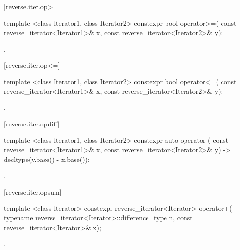 [reverse.iter.op>=]{}

%
\begin{itemdecl}
template <class Iterator1, class Iterator2>
  constexpr bool operator>=(
    const reverse_iterator<Iterator1>& x,
    const reverse_iterator<Iterator2>& y);
\end{itemdecl}

\begin{itemdescr}
\pnum
\returns
{}.
\end{itemdescr}

[reverse.iter.op<=]{}

%
\begin{itemdecl}
template <class Iterator1, class Iterator2>
  constexpr bool operator<=(
    const reverse_iterator<Iterator1>& x,
    const reverse_iterator<Iterator2>& y);
\end{itemdecl}

\begin{itemdescr}
\pnum
\returns
{}.
\end{itemdescr}

[reverse.iter.opdiff]{}

%
\begin{itemdecl}
template <class Iterator1, class Iterator2>
    constexpr auto operator-(
    const reverse_iterator<Iterator1>& x,
    const reverse_iterator<Iterator2>& y) -> decltype(y.base() - x.base());
\end{itemdecl}

\begin{itemdescr}
\pnum
\returns
{}.
\end{itemdescr}

[reverse.iter.opsum]{}

%
\begin{itemdecl}
template <class Iterator>
  constexpr reverse_iterator<Iterator> operator+(
    typename reverse_iterator<Iterator>::difference_type n,
    const reverse_iterator<Iterator>& x);
\end{itemdecl}

\begin{itemdescr}
\pnum
\returns
{}.
\end{itemdescr}

